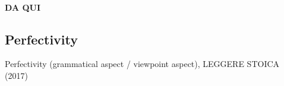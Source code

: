 
\paragraph{DA QUI}






\subsection{Perfectivity} 

Perfectivity (grammatical aspect / viewpoint aspect), LEGGERE STOICA (2017)



